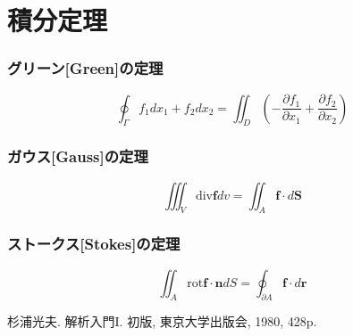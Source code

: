 \documentclass[a4paper,10pt,report]{amsart}
\theoremstyle{plain}
\theoremstyle{definition}
\theoremstyle{remark}
\begin{document}
    \part{積分定理}
    \section{グリーン[Green]の定理}
    \begin{equation}
        \oint_{\Gamma}f_{1}dx_{1}+f_{2}dx_{2}=\iint_{D}\left(-\frac{\partial f_{1}}{\partial x_{1}}+\frac{\partial f_{2}}{\partial x_{2}}\right )
    \end{equation}
    \section{ガウス[Gauss]の定理}
    \begin{equation}
        \iiint_{V}\mathrm{div}\bm{f}dv=\iint_{A}\bm{f}\cdot d\bm{S}
    \end{equation}
    \section{ストークス[Stokes]の定理}
    \begin{equation}
        \iint_{A}\mathrm{rot}\bm{f}\cdot\bm{n}dS=\oint_{\partial A}\bm{f}\cdot d\bm{r}
    \end{equation}
    \begin{thebibliography}{9}
        杉浦光夫. 解析入門I. 初版, 東京大学出版会, 1980, 428p.
    \end{thebibliography}
    
\end{document}
